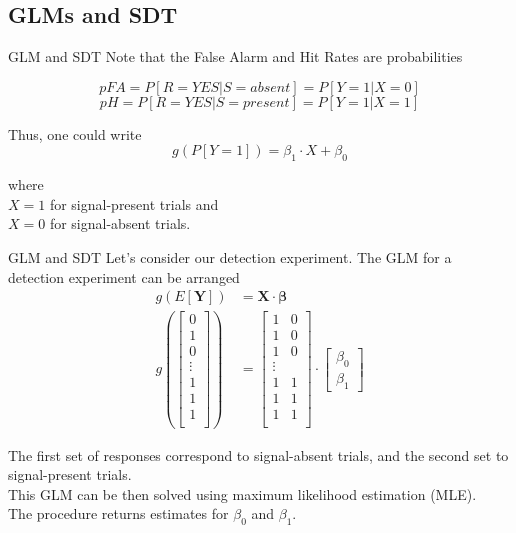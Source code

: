 \documentclass[10pt]{beamer}
\begin{document}
\subsection{GLMs and SDT}
%
\begin{frame}{GLM and SDT}
Note that the False Alarm and Hit Rates are probabilities

$$ pFA = P[R=YES| S=absent] = P[Y=1 | X=0] $$
$$ pH =P[R=YES | S=present] = P[Y=1 | X=1] $$

Thus, one could write 
$$g(P[Y=1]) = \beta_1 \cdot X + \beta_0 $$

\hfill where \\
\hfill $X=1$ for signal-present trials and \\
\hfill $X=0$ for signal-absent trials.

\end{frame}


\begin{frame}{GLM and SDT}
Let's consider our detection experiment. The GLM for a detection experiment can be arranged
\begin{align*}
g(E[\mathbf{Y}]) &= \mathbf{X} \cdot \mathbf{\beta}\\
    g( 
    \begin{bmatrix}
           0 \\
           1 \\
           0 \\
           \vdots \\
           1 \\
           1 \\
           1 \\
    \end{bmatrix} ) &= 
    \begin{bmatrix}
           1 & 0 \\
           1 & 0 \\
           1 & 0 \\
           \vdots \\
           1 & 1 \\
           1 & 1 \\
           1 & 1 \\
    \end{bmatrix} \cdot
    \begin{bmatrix}
           \beta_0 \\
           \beta_1 
    \end{bmatrix}
\end{align*}

The first set of responses correspond to signal-absent trials, and the second set to signal-present trials. \\
This GLM can be then solved using maximum likelihood estimation (MLE).\\
The procedure returns estimates for $\beta_0$ and $\beta_1$.


\end{frame}
\end{document}
